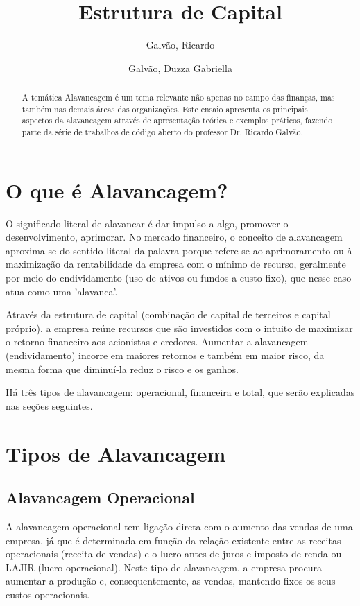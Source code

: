 \documentclass[a4paper,12pt]{article}
\title{Estrutura de Capital}
\author{Galvão, Ricardo\\
\and 
Galvão, Duzza Gabriella}
\begin{document}
\maketitle
\tableofcontents

\newpage

\begin{abstract}

A temática Alavancagem é um tema relevante não apenas no campo das finanças, mas também nas demais áreas das organizações. Este ensaio apresenta os principais aspectos da alavancagem através de apresentação teórica e exemplos práticos, fazendo parte da série de trabalhos de código aberto do professor Dr. Ricardo Galvão.

\end{abstract}


\section{O que é Alavancagem?}

O significado literal de alavancar é dar impulso a algo, promover o desenvolvimento, aprimorar. No mercado financeiro, o conceito de alavancagem aproxima-se do sentido literal da palavra porque refere-se ao aprimoramento ou à maximização da rentabilidade da empresa com o mínimo de recurso, geralmente por meio do endividamento (uso de ativos ou fundos a custo fixo), que nesse caso atua como uma 'alavanca'. 

Através da estrutura de capital (combinação de capital de terceiros e capital próprio), a empresa reúne recursos que são investidos com o intuito de maximizar o retorno financeiro aos acionistas e credores. Aumentar a alavancagem (endividamento) incorre em maiores retornos e também em maior risco, da mesma forma que diminuí-la reduz o risco e os ganhos.

Há três tipos de alavancagem: operacional, financeira e total, que serão explicadas nas seções seguintes.

\section{Tipos de Alavancagem}

\subsection{Alavancagem Operacional}

A alavancagem operacional tem ligação direta com o aumento das vendas de uma empresa, já que é determinada em função da relação existente entre as receitas operacionais (receita de vendas) e o lucro antes de juros e imposto de renda ou LAJIR (lucro operacional). Neste tipo de alavancagem, a empresa procura aumentar a produção e, consequentemente, as vendas, mantendo fixos os seus custos operacionais.
\end{document}
